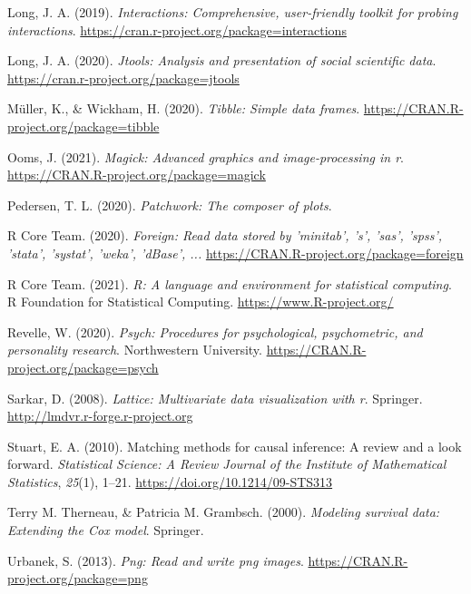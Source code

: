 \documentclass[
  english,
  man, noextraspace]{apa7}
\begin{document}
\begin{appendix}
\leavevmode\hypertarget{ref-R-interactions}{}%
Long, J. A. (2019). \emph{Interactions: Comprehensive, user-friendly
toolkit for probing interactions}.
\url{https://cran.r-project.org/package=interactions}

\leavevmode\hypertarget{ref-R-jtools}{}%
Long, J. A. (2020). \emph{Jtools: Analysis and presentation of social
scientific data}. \url{https://cran.r-project.org/package=jtools}

\leavevmode\hypertarget{ref-R-tibble}{}%
Müller, K., \& Wickham, H. (2020). \emph{Tibble: Simple data frames}.
\url{https://CRAN.R-project.org/package=tibble}

\leavevmode\hypertarget{ref-R-magick}{}%
Ooms, J. (2021). \emph{Magick: Advanced graphics and image-processing in
r}. \url{https://CRAN.R-project.org/package=magick}

\leavevmode\hypertarget{ref-R-patchwork}{}%
Pedersen, T. L. (2020). \emph{Patchwork: The composer of plots}.

\leavevmode\hypertarget{ref-R-foreign}{}%
R Core Team. (2020). \emph{Foreign: Read data stored by 'minitab', 's',
'sas', 'spss', 'stata', 'systat', 'weka', 'dBase', ...}
\url{https://CRAN.R-project.org/package=foreign}

\leavevmode\hypertarget{ref-R-base}{}%
R Core Team. (2021). \emph{R: A language and environment for statistical
computing}. R Foundation for Statistical Computing.
\url{https://www.R-project.org/}

\leavevmode\hypertarget{ref-R-psych}{}%
Revelle, W. (2020). \emph{Psych: Procedures for psychological,
psychometric, and personality research}. Northwestern University.
\url{https://CRAN.R-project.org/package=psych}

\leavevmode\hypertarget{ref-R-lattice}{}%
Sarkar, D. (2008). \emph{Lattice: Multivariate data visualization with
r}. Springer. \url{http://lmdvr.r-forge.r-project.org}

\leavevmode\hypertarget{ref-stuartMatchingMethodsCausal2010}{}%
Stuart, E. A. (2010). Matching methods for causal inference: A review
and a look forward. \emph{Statistical Science: A Review Journal of the
Institute of Mathematical Statistics}, \emph{25}(1), 1--21.
\url{https://doi.org/10.1214/09-STS313}

\leavevmode\hypertarget{ref-R-survival-book}{}%
Terry M. Therneau, \& Patricia M. Grambsch. (2000). \emph{Modeling
survival data: Extending the Cox model}. Springer.

\leavevmode\hypertarget{ref-R-png}{}%
Urbanek, S. (2013). \emph{Png: Read and write png images}.
\url{https://CRAN.R-project.org/package=png}


\end{appendix}
\end{document}
